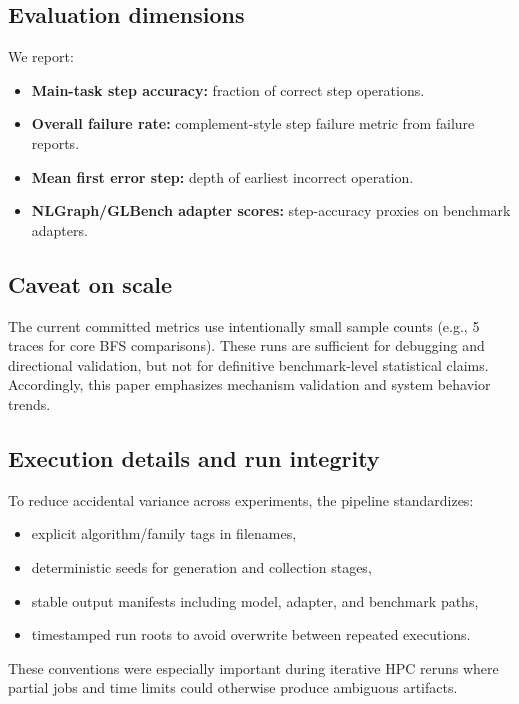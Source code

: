 \documentclass[sigplan,screen]{acmart}
\begin{document}
\subsection{Evaluation dimensions}
We report:
\begin{itemize}
  \item \textbf{Main-task step accuracy:} fraction of correct step operations.
  \item \textbf{Overall failure rate:} complement-style step failure metric from failure reports.
  \item \textbf{Mean first error step:} depth of earliest incorrect operation.
  \item \textbf{NLGraph/GLBench adapter scores:} step-accuracy proxies on benchmark adapters.
\end{itemize}

\subsection{Caveat on scale}
The current committed metrics use intentionally small sample counts (e.g., 5 traces for core BFS comparisons).
These runs are sufficient for debugging and directional validation, but not for definitive benchmark-level statistical claims.
Accordingly, this paper emphasizes mechanism validation and system behavior trends.

\subsection{Execution details and run integrity}
To reduce accidental variance across experiments, the pipeline standardizes:
\begin{itemize}
  \item explicit algorithm/family tags in filenames,
  \item deterministic seeds for generation and collection stages,
  \item stable output manifests including model, adapter, and benchmark paths,
  \item timestamped run roots to avoid overwrite between repeated executions.
\end{itemize}
These conventions were especially important during iterative HPC reruns where partial jobs and time limits could otherwise produce ambiguous artifacts.
\end{document}
